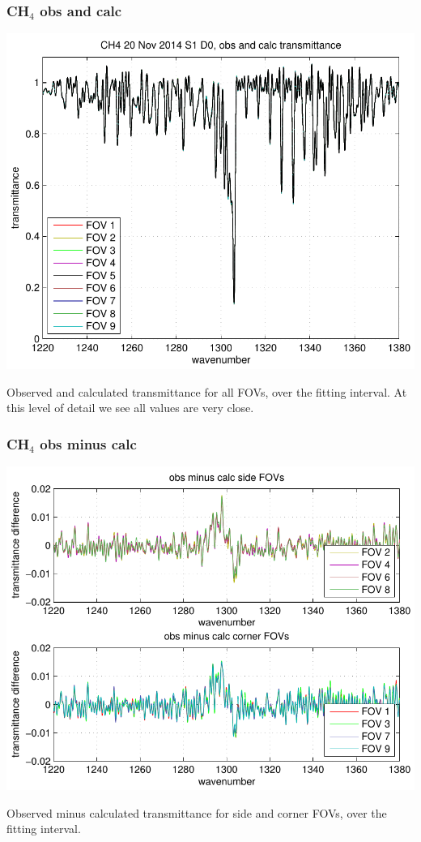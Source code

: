 \documentclass[11pt]{beamer}
\begin{document}
\begin{frame}
\frametitle{CH$_4$ obs and calc}

\begin{center}
  \includegraphics[scale=0.54]{figures/CH4_obs_and_calc.pdf}
\end{center}

Observed and calculated transmittance for all FOVs, over the fitting
interval.  At this level of detail we see all values are very close.

\end{frame}
\begin{frame}
\frametitle{CH$_4$ obs minus calc}

\begin{center}
  \includegraphics[scale=0.54]{figures/CH4_breakout_2.pdf}
\end{center}

Observed minus calculated transmittance for side and corner FOVs,
over the fitting interval.

\end{frame}
\end{document}
